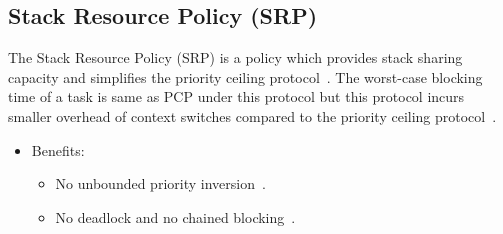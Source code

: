 \subsection{Stack Resource Policy (SRP)}
The Stack Resource Policy (SRP) is a policy which provides stack sharing capacity and simplifies the priority ceiling protocol~\cite{JiacunWang.2017}. The worst-case blocking time of a task is same as PCP under this protocol but this protocol incurs smaller overhead of context switches compared to the priority ceiling protocol~\cite{JiacunWang.2017}. 
\begin{itemize}
    \item Benefits: 
    \begin{itemize}
        \item No unbounded priority inversion~\cite{JiacunWang.2017}.
        \item No deadlock and no chained blocking~\cite{JiacunWang.2017}.
    \end{itemize}
\end{itemize}